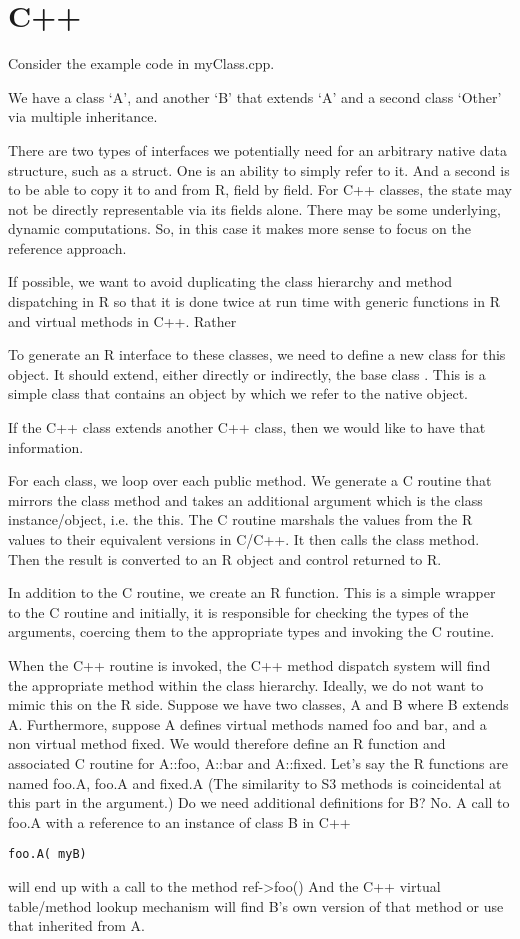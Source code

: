 \documentclass{article}
\begin{document}
\section{C++}

Consider the  example  code in myClass.cpp.

We have a class `A', and another `B' that extends `A' and a second class
`Other' via multiple inheritance.


There are two types of interfaces we potentially need
for an arbitrary native data structure, such as a struct.
One is an ability to simply refer to it.
And a second is to be able to copy it to and from R,
field by field.
For C++ classes, the state may not be directly representable
via its fields alone. There may be some underlying, dynamic
computations. So, in this case it makes more sense to focus
on the reference approach.

If possible, we want to avoid duplicating the class
hierarchy and method dispatching in R so that it is
done twice at run time with generic functions in R and
virtual methods in C++.
Rather

To generate an R interface to these classes,
we need to define a new class for this object.
It should extend, either directly or indirectly, the base class
. This is a simple class that
contains an  object by which we refer to the 
native object.

If the C++ class extends another C++ class, then we would like
to have that information.


For each class, we loop over each public method.
We generate a C routine that mirrors
the class method and takes an additional argument
which is the class instance/object, i.e. the this.
The C routine marshals the values from the
R values to their equivalent versions in C/C++.
It then calls the  class method.
Then the result is converted to an R object
and control returned to R.

In addition to the C routine, we create an
R function. This is a simple wrapper to the C
routine and initially, it is responsible for
checking the types of the arguments, 
coercing them to the appropriate types
and invoking the C routine.


When the C++ routine is invoked, the
C++ method dispatch system will 
find the appropriate method within the
class hierarchy.   Ideally, we do not want
to mimic this on the R side.
Suppose we have two classes, A and B where
B extends A. Furthermore, suppose 
A defines  virtual methods named foo
and bar, and a non virtual method 
fixed.
We would therefore define
an R  function and associated C routine
for A::foo, A::bar and A::fixed.
Let's say the R functions are named
foo.A, foo.A and fixed.A
(The similarity to S3 methods is coincidental
at this part in the argument.)
Do we need additional definitions for B?
No. 
A call to  foo.A
with a reference to an instance of class B in C++
\begin{verbatim}
foo.A( myB)
\end{verbatim}
will end up with a call
to the method  ref->foo()
And the C++ virtual table/method lookup mechanism
will find B's own version of that method or use
that inherited from A.
\end{document}
